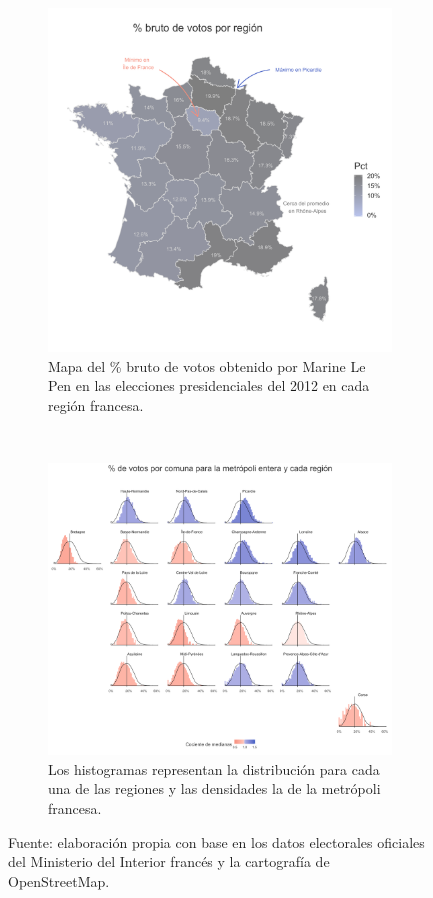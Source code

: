 \begin{figure}[h]
	\centering
	\begin{subfigure}{0.425\textwidth}
	\includegraphics[width = \textwidth]{Figs/AED/Pct_Br_Reg_P12_FN}
	\caption{Mapa del \% bruto de votos obtenido por Marine Le Pen en las elecciones presidenciales del 2012 en cada región francesa.}
	\label{fig:Pct_Br_Reg_P12}		
	\end{subfigure}
	~
	\begin{subfigure}{0.475\textwidth}
	\includegraphics[width = \textwidth]{Figs/AED/Geofacet_Reg_P12_FN}
	\caption{Los histogramas representan la distribución para cada una de las regiones y las densidades la de la metrópoli francesa.}
	\label{fig:Geofacet_Distr_Reg_P12}
	\end{subfigure}
	\caption{Fuente: elaboración propia con base en los datos electorales oficiales del Ministerio del Interior francés y la cartografía de OpenStreetMap.}
\end{figure}

